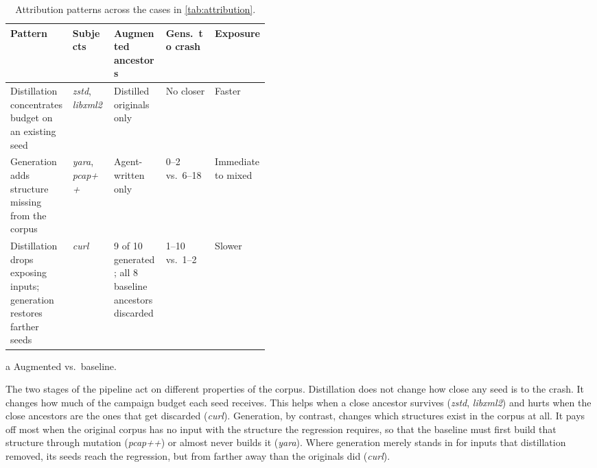 \begin{table}[t]
  \centering
  \begin{threeparttable}
    \footnotesize
    \begin{tabular}{p{0.24\linewidth} l p{0.20\linewidth} l l}
      \toprule
      \textbf{Pattern} & \textbf{Subjects} & \textbf{Augmented ancestors}
        & \textbf{Gens.\ to crash}\tnote{a} & \textbf{Exposure}\tnote{a} \\
      \midrule
      Distillation concentrates budget on an existing seed
        & \emph{zstd}, \emph{libxml2}
        & Distilled originals only
        & No closer
        & Faster \\
      \addlinespace
      Generation adds structure missing from the corpus
        & \emph{yara}, \emph{pcap++}
        & Agent-written only
        & \numrange{0}{2} vs.\ \numrange{6}{18}
        & Immediate to mixed \\
      \addlinespace
      Distillation drops exposing inputs; generation restores farther seeds
        & \emph{curl}
        & \num{9} of \num{10} generated; all \num{8} baseline ancestors discarded
        & \numrange{1}{10} vs.\ \numrange{1}{2}
        & Slower \\
      \bottomrule
    \end{tabular}
    \begin{tablenotes}
      \item[a] Augmented vs.\ baseline.
    \end{tablenotes}
    \caption{Attribution patterns across the cases in \cref{tab:attribution}.}
    \label{tab:attribution-patterns}
  \end{threeparttable}
\end{table}

The two stages of the pipeline act on different properties of the corpus.
Distillation does not change how close any seed is to the crash.
It changes how much of the campaign budget each seed receives.
This helps when a close ancestor survives (\emph{zstd}, \emph{libxml2}) and hurts when the close ancestors are the ones that get discarded (\emph{curl}).
Generation, by contrast, changes which structures exist in the corpus at all.
It pays off most when the original corpus has no input with the structure the regression requires, so that the baseline must first build that structure through mutation (\emph{pcap++}) or almost never builds it (\emph{yara}).
Where generation merely stands in for inputs that distillation removed, its seeds reach the regression, but from farther away than the originals did (\emph{curl}).


